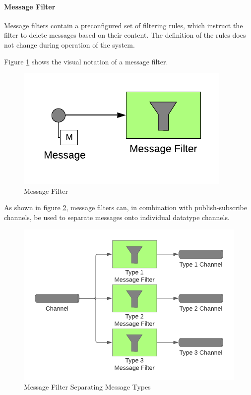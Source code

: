 \paragraph{Message Filter}

Message filters contain a preconfigured set of filtering rules, which instruct the filter to delete messages based on their content. The definition of the rules does not change during operation of the system.

Figure \ref{messaging:filter1} shows the visual notation of a message filter.

\begin{figure}[H]
    \centering
    \includegraphics[scale=0.6]{Diagrams/Messaging/8. Message Filter.pdf}
    \caption{Message Filter}
    \label{messaging:filter1}
\end{figure}

As shown in figure \ref{messaging:filter2}, message filters can, in combination with publish-subscribe channels, be used to separate messages onto individual datatype channels.

\begin{figure}[H]
    \centering
    \includegraphics[scale=0.6]{Diagrams/Messaging/9. Message Filter.pdf}
    \caption{Message Filter Separating Message Types}
    \label{messaging:filter2}
\end{figure}

